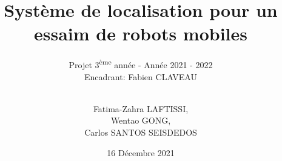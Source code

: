 \documentclass{article} %
\author{\\Fatima-Zahra LAFTISSI, \\ Wentao GONG, \\ Carlos SANTOS SEISDEDOS}
\date{16 Décembre 2021}
\title{Système de localisation pour un essaim de robots mobiles}
\subtitle{Projet 3\textsuperscript{ème} année - Année 2021 - 2022 \\
\large{Encadrant: Fabien CLAVEAU}}
\begin{document}
\imtaMaketitlepage


\tableofcontents






{}


\imtaMakeCover
\end{document}

